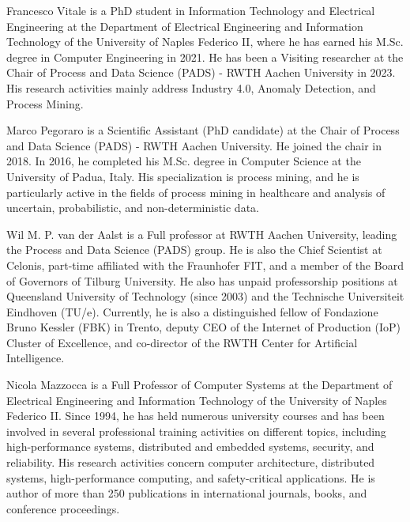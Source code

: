 \begin{IEEEbiography}{Francesco Vitale} is a PhD student in Information Technology and Electrical Engineering at the Department of Electrical Engineering and Information Technology of the University of Naples Federico II, where he has earned his M.Sc. degree in Computer Engineering in 2021. He has been a Visiting researcher at the Chair of Process and Data Science (PADS) - RWTH Aachen University in 2023. His research activities mainly address Industry 4.0, Anomaly Detection, and Process Mining.
\end{IEEEbiography}

\begin{IEEEbiography}{Marco Pegoraro} is a Scientific Assistant (PhD
candidate) at the Chair of Process and Data Science (PADS) - RWTH Aachen University. He joined the chair in 2018. In 2016, he completed his M.Sc. degree in Computer Science at the University of Padua, Italy. His specialization is process mining, and he is particularly active in the fields of process mining in healthcare and analysis of uncertain, probabilistic, and non-deterministic data.
\end{IEEEbiography}

\begin{IEEEbiography}{Wil M. P. van der Aalst} is a Full professor at RWTH Aachen University, leading the Process and Data Science (PADS) group. He is also the Chief Scientist at Celonis, part-time affiliated with the Fraunhofer FIT, and a member of the Board of Governors of Tilburg University. He also has unpaid professorship positions at Queensland University of Technology (since 2003) and the Technische Universiteit Eindhoven (TU/e). Currently, he is also a distinguished fellow of Fondazione Bruno Kessler (FBK) in Trento, deputy CEO of the Internet of Production (IoP) Cluster of Excellence, and co-director of the RWTH Center for Artificial Intelligence.

\end{IEEEbiography}
\begin{IEEEbiography}{Nicola Mazzocca} is a Full Professor of Computer Systems at the Department of Electrical Engineering and Information Technology of the University of Naples Federico II. Since 1994, he has held numerous university courses and has been involved in several professional training activities on different topics, including high-performance systems, distributed and embedded systems, security, and reliability. His research activities concern computer architecture, distributed systems, high-performance computing, and safety-critical applications. He is author of more than 250 publications in international journals, books, and conference proceedings.
\end{IEEEbiography}
\vfill